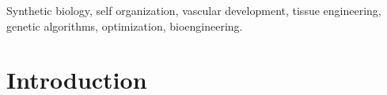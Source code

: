 \documentclass[conference]{IEEEtran}
\begin{document}







\maketitle
\thispagestyle{plain}

\begin{abstract}

\end{abstract}



\renewcommand\IEEEkeywordsname{Key Words}
\begin{IEEEkeywords}
Synthetic biology, self organization, vascular development, tissue engineering, genetic algorithms, optimization, bioengineering.
\end{IEEEkeywords}

%

\section{Introduction}
\end{document}
